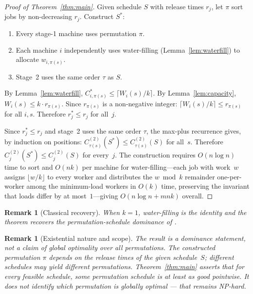\documentclass[11pt,titlepage]{article}
\newtheorem{remark}[theorem]{Remark}
\begin{document}
\begin{proof}[Proof of Theorem~\ref{thm:main}]
Given schedule $S$ with release times $r_j$, let $\pi$ sort
jobs by non-decreasing $r_j$. Construct $S^*$:
\begin{enumerate}
  \item Every stage-1 machine uses permutation $\pi$.
  \item Each machine $i$ independently uses water-filling
        (Lemma~\ref{lem:waterfill}) to allocate $w_{i,\pi(s)}$.
  \item Stage~2 uses the same order $\tau$ as $S$.
\end{enumerate}

By Lemma~\ref{lem:waterfill},
$C^*_{i,\pi(s)} \leq \lceil W_i(s)/k \rceil$.
By Lemma~\ref{lem:capacity}, $W_i(s) \leq k \cdot r_{\pi(s)}$.
Since $r_{\pi(s)}$ is a non-negative integer:
$\lceil W_i(s)/k \rceil \leq r_{\pi(s)}$ for all $i, s$.
Therefore $r^*_j \leq r_j$ for all~$j$.

Since $r^*_j \leq r_j$ and stage~2 uses the same order $\tau$,
the max-plus recurrence gives, by induction on positions:
$C^{(2)}_{\tau(s)}(S^*) \leq C^{(2)}_{\tau(s)}(S)$ for all~$s$.
Therefore $C^{(2)}_j(S^*) \leq C^{(2)}_j(S)$ for every~$j$.
The construction requires $O(n \log n)$ time to sort and
$O(nk)$ per machine for water-filling---each job with work~$w$
assigns $\lfloor w/k \rfloor$ to every worker and distributes
the $w \bmod k$ remainder one-per-worker among the
minimum-load workers in $O(k)$ time, preserving the invariant
that loads differ by at most~$1$---giving
$O(n \log n + mnk)$ overall.
\end{proof}

\begin{remark}[Classical recovery]
When $k = 1$, water-filling is the identity and the theorem
recovers the permutation-schedule dominance of
\textcite{potts1995}.
\end{remark}

\begin{remark}[Existential nature and scope]
\label{rem:existential}
The result is a \emph{dominance} statement, not a claim of
global optimality over all permutations. The constructed
permutation $\pi$ depends on the release times of the given
schedule~$S$; different schedules may yield different
permutations. Theorem~\ref{thm:main} asserts that for every
feasible schedule, \emph{some} permutation schedule is at
least as good pointwise. It does not identify which
permutation is globally optimal --- that remains NP-hard.
\end{remark}
\end{document}
